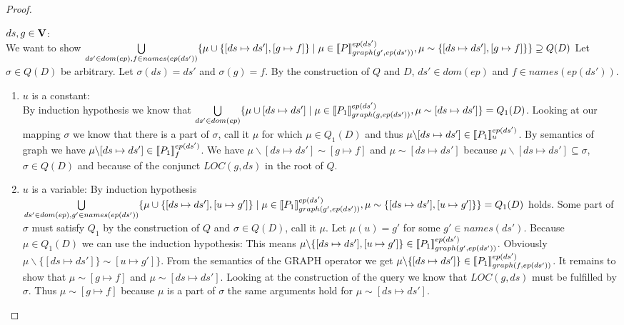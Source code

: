 \begin{proof}
\begin{enumerate}
			\bigskip\noindent
			$ds,g \in \mathbf{V}$:\\
			We want to show 
			$\bigcup\limits_{ds' \in dom(ep), f \in names(ep(ds'))} \{ \mu \cup
				\{[ds \mapsto ds'],[g \mapsto f]\} \mid \mu \in
				\llbracket P\rrbracket^{ep(ds')}_{graph(g',ep(ds'))}, 
				\mu \sim
			\{[ds\mapsto ds'], [g \mapsto f]\}\} \supseteq Q(D) $
			Let $\sigma \in Q(D)$ be arbitrary. Let $\sigma(ds) = ds'$ and
			$\sigma(g) = f$. By the construction of $Q$ and $D$, $ds' \in
			dom(ep)$ and $f \in names(ep(ds'))$.
			\begin{enumerate}
				\item $u$ is a constant: \\
					By induction hypothesis we know that 
					$\bigcup\limits_{ds' \in dom(ep)} \{ \mu \cup [ds \mapsto ds'] \mid \mu \in
						\llbracket P_1 \rrbracket^{ep(ds')}_{graph(g,ep(ds'))}, \mu \sim
					[ds\mapsto ds'] \}  = Q_1(D) $. Looking at our mapping
					$\sigma$ we know that there is a part of $\sigma$, call it $\mu$
					for which $\mu \in Q_1(D)$ and thus
					$\mu \backslash [ds\mapsto ds'] \in \llbracket P_1
					\rrbracket^{ep(ds')}_{u}$. By semantics of graph we have 
					$\mu \backslash [ds\mapsto ds'] \in \llbracket P_1
					\rrbracket^{ep(ds')}_{f}$.
					We have $\mu \backslash [ds \mapsto ds'] \sim [g \mapsto f]$ 
					and $\mu \sim [ds \mapsto ds']$ because  $\mu \backslash [ds \mapsto
					ds']\subseteq \sigma$, $\sigma \in Q(D)$ and 
					because of the conjunct $LOC(g,ds)$ in the root of $Q$.
				\item $u$ is a variable:
					By induction hypothesis
					$\bigcup\limits_{ds' \in dom(ep), g' \in names(ep(ds'))} \{ \mu
						\cup \{[ds \mapsto ds'],[u \mapsto g']\} \mid \mu \in
						\llbracket P_1\rrbracket^{ep(ds')}_{graph(g',ep(ds'))}, 
						\mu \sim
					\{[ds\mapsto ds'], [u \mapsto g']\}\} = Q_1(D) $  
					holds. 
					Some part of $\sigma$ must satisfy $Q_1$ by the construction of
					$Q$ and $\sigma \in Q(D)$, call it $\mu$. Let $\mu(u) = g'$
					for some $g' \in names(ds')$. Because $\mu \in
					Q_1(D)$ we can use the induction hypothesis:
					This means $\mu\backslash\{[ds \mapsto ds'],[u
					\mapsto g']\} \in \llbracket
					P_1\rrbracket^{ep(ds')}_{graph(g',ep(ds'))}$. Obviously $\mu
					\backslash\{[ds \mapsto ds']\} \sim [u \mapsto g']\}$.
					From the semantics of the GRAPH operator we get 
					$\mu\backslash\{[ds \mapsto ds']\} \in \llbracket
					P_1\rrbracket^{ep(ds')}_{graph(f,ep(ds'))}$.
					It remains to show that $\mu \sim
					[g \mapsto f]$ and $\mu \sim [ds \mapsto ds']$. Looking at
					the construction of the query we know
					that $LOC(g,ds)$ must be fulfilled by $\sigma$. 
					Thus $\mu \sim [g\mapsto f]$
					because $\mu$ is a part of $\sigma$ the same arguments
					hold for $\mu \sim [ds \mapsto ds']$.
			\end{enumerate}


\end{enumerate}
\end{proof}
